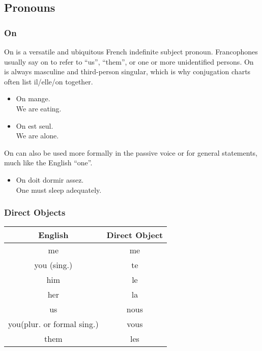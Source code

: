 \pagebreak
\subsection{Pronouns}

\subsubsection{On}

\guillemotleft On \guillemotright is a versatile and ubiquitous French indefinite subject pronoun. Francophones usually say on to refer to ``us'', ``them'', or one or more unidentified persons. \guillemotleft On \guillemotright is always masculine and third-person singular, which is why conjugation charts often list il/elle/on together.

\begin{itemize}
  \item  On mange. \\ We are eating.
  \item  On est seul. \\ We are alone.
\end{itemize}

\guillemotleft On \guillemotright can also be used more formally in the passive voice or for general statements, much like the English ``one''.

\begin{itemize}
  \item  On doit dormir assez. \\ One must sleep adequately.
\end{itemize}

\subsubsection{Direct Objects}

\begin{center}\begin{tabular}{|c|c|}
\hline
\textbf{English}           & \textbf{Direct Object} \\ \hline
me                         & me                     \\ \hline
you (sing.)                & te                     \\ \hline
him                        & le                     \\ \hline
her                        & la                     \\ \hline
us                         & nous                   \\ \hline
you(plur. or formal sing.) & vous                   \\ \hline
them                       & les                    \\ \hline
\end{tabular}\end{center}

